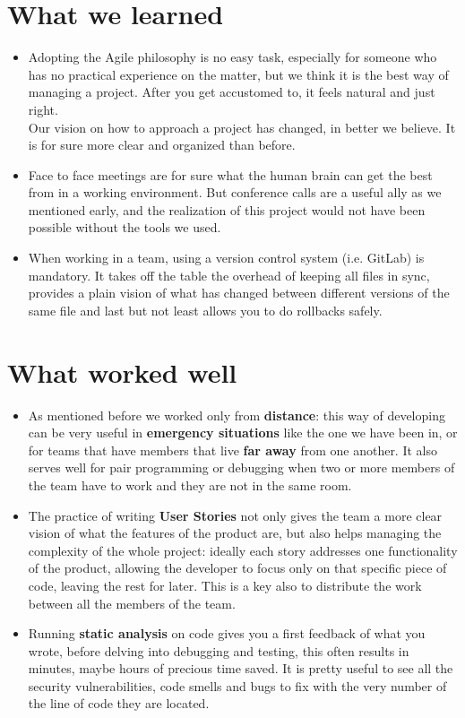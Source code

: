\documentclass[a4paper,10pt]{report}
\begin{document}
\section{What we learned} %
\begin{itemize}
	
	\item Adopting the Agile philosophy is no easy task, especially for someone who has no practical experience on the matter, but we think it is the best way of managing a project. After you get accustomed to, it feels natural and just right.\\
	Our vision on how to approach a project has changed, in better we believe. It is for sure more clear and organized than before.
	\item Face to face meetings are for sure what the human brain can get the best from in a working environment.
	But conference calls are a useful ally as we mentioned early, and the realization of this project would not have been possible without the tools we used. 
	\item When working in a team, using a version control system (i.e. GitLab) is mandatory. It takes off the table the overhead of keeping all files in sync, provides a plain vision of what has changed between different versions of the same file and last but not least allows you to do rollbacks safely.
\end{itemize}
\section{What worked well} %
\begin{itemize}
	\item As mentioned before we worked only from \textbf{distance}: this way of developing can be very useful in \textbf{emergency situations} like the one we have been in, or for teams that have members that live \textbf{far away} from one another.
	It also serves well for pair programming or debugging when two or more members of the team have to work and they are not in the same room.
	\item The practice of writing \textbf{User Stories} not only gives the team a more clear vision of what the features of the product are, but also helps managing the complexity of the whole project: ideally each story addresses one functionality of the product, allowing the developer to focus only on that specific piece of code, leaving the rest for later. This is a key also to distribute the work between all the members of the team.
	\item Running \textbf{static analysis} on code gives you a first feedback of what you wrote, before delving into debugging and testing, this often results in minutes, maybe hours of precious time saved. It is pretty useful to see all the security vulnerabilities, code smells and bugs to fix with the very number of the line of code they are located.
\end{itemize}
\end{document}

